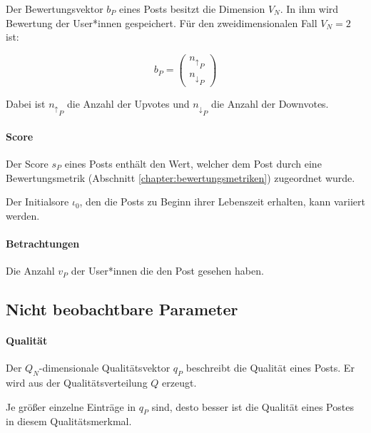 Der Bewertungsvektor $b_P$ eines Posts besitzt die Dimension $V_N$. In ihm wird Bewertung der User*innen gespeichert. Für den zweidimensionalen Fall $V_N = 2$ ist:

\begin{equation}
b_P = \begin{pmatrix}
{n_\uparrow}_P \\
{n_\downarrow}_P 
\end{pmatrix}
\end{equation}

Dabei ist ${n_\uparrow}_P$ die Anzahl der Upvotes und ${n_\downarrow}_P$ die Anzahl der Downvotes.

\paragraph{Score}

Der Score $s_P$ eines Posts enthält den Wert, welcher dem Post durch eine Bewertungsmetrik (Abschnitt \ref{chapter:bewertungsmetriken}) zugeordnet wurde.

Der Initialsore $\iota_{0}$, den die Posts zu Beginn ihrer Lebenszeit erhalten, kann variiert werden.

\paragraph{Betrachtungen}

Die Anzahl $v_P$ der User*innen die den Post gesehen haben.

\subsection{Nicht beobachtbare Parameter}

\paragraph{Qualität}
\label{pqualitaet}

Der $Q_N$-dimensionale Qualitätsvektor $q_P$ beschreibt die Qualität eines Posts. Er wird aus der Qualitätsverteilung $Q$ erzeugt. 

Je größer einzelne Einträge in $q_P$ sind, desto besser ist die Qualität eines Postes in diesem Qualitätsmerkmal.



